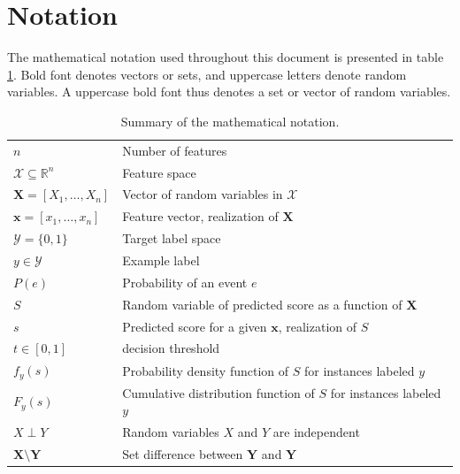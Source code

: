 \section{Notation}

The mathematical notation used throughout this document is presented in table
\ref{tab:notation}. Bold font denotes vectors or sets, and uppercase letters
denote random variables. A uppercase bold font thus denotes a set or vector of
random variables.

\begin{table}
    \centering
    \begin{tabular}{ll}
        \toprule
        $n$ & Number of features\\
        $\mathcal X\subseteq\mathbb R^n$ & Feature space\\
        $\bm X = [X_1,\dots,X_n]$ & Vector of random variables in $\mathcal X$\\
        $\bm x = [x_1,\dots,x_n]$ & Feature vector, realization of $\bm X$\\
        $\mathcal Y=\{0, 1\}$ & Target label space\\
        $y\in\mathcal Y$ & Example label \\
        $P(e)$ & Probability of an event $e$\\
        $S$ & Random variable of predicted score as a function of $\bm X$\\
        $s$ & Predicted score for a given $\bm x$, realization of $S$\\
        $t\in [0, 1]$ & decision threshold\\
        $f_y(s)$ & Probability density function of $S$ for instances labeled $y$\\
        $F_y(s)$ & Cumulative distribution function of $S$ for instances labeled $y$\\
        $X\perp Y$ & Random variables $X$ and $Y$ are independent\\
        $\bm X\setminus \bm Y$ & Set difference between $\bm Y$ and $\bm Y$\\
        \bottomrule
    \end{tabular}
    \caption{Summary of the mathematical notation.}
    \label{tab:notation}
\end{table}
